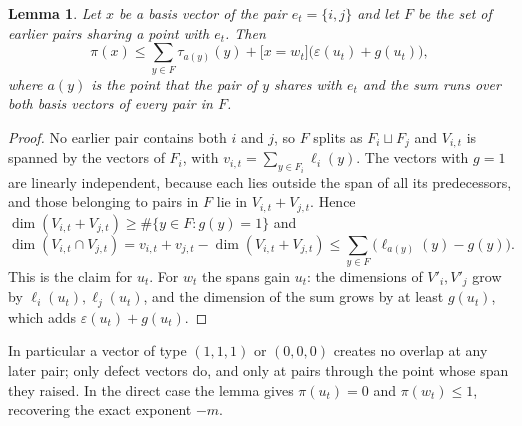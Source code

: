 \documentclass[11pt]{article}
\newtheorem{lemma}{Lemma}
\begin{document}
\begin{lemma}\label{lem:overlap}
Let $x$ be a basis vector of the pair $e_t=\{i,j\}$ and let $F$ be the set
of earlier pairs sharing a point with $e_t$. Then
\[
 \pi(x)\le\sum_{y\in F}\tau_{a(y)}(y)
 +\bigl[x=w_t\bigr]\bigl(\varepsilon(u_t)+g(u_t)\bigr),
\]
where $a(y)$ is the point that the pair of $y$ shares with $e_t$ and the sum
runs over both basis vectors of every pair in $F$.
\end{lemma}
\begin{proof}
No earlier pair contains both $i$ and $j$, so $F$ splits as $F_i\sqcup F_j$
and $V_{i,t}$ is spanned by the vectors of $F_i$, with
$v_{i,t}=\sum_{y\in F_i}\ell_i(y)$. The vectors with $g=1$ are linearly
independent, because each lies outside the span of all its predecessors,
and those belonging to pairs in $F$ lie in $V_{i,t}+V_{j,t}$. Hence
$\dim(V_{i,t}+V_{j,t})\ge\#\{y\in F:g(y)=1\}$ and
\[
 \dim(V_{i,t}\cap V_{j,t})
 =v_{i,t}+v_{j,t}-\dim(V_{i,t}+V_{j,t})
 \le\sum_{y\in F}\bigl(\ell_{a(y)}(y)-g(y)\bigr).
\]
This is the claim for $u_t$. For $w_t$ the spans gain $u_t$: the dimensions
of $V'_i,V'_j$ grow by $\ell_i(u_t),\ell_j(u_t)$, and the dimension of the
sum grows by at least $g(u_t)$, which adds $\varepsilon(u_t)+g(u_t)$.
\end{proof}

In particular a vector of type $(1,1,1)$ or $(0,0,0)$ creates no overlap
at any later pair; only defect vectors do, and only at pairs through the
point whose span they raised. In the direct case the lemma gives
$\pi(u_t)=0$ and $\pi(w_t)\le1$, recovering the exact exponent $-m$.
\end{document}
